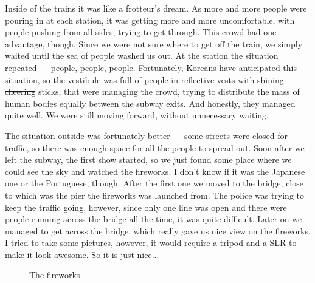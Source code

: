 \begin{post}
\begin{content}
Inside of the trains it was like a frotteur's dream. As more and more people were pouring in at each station, it was getting more and more uncomfortable, with people pushing from all sides, trying to get through. This crowd had one advantage, though. Since we were not sure where to get off the train, we simply waited until the sea of people washed us out. At the station the situation repeated — people, people, people. Fortunately, Koreans have anticipated this situation, so the vestibule was full of people in reflective vests with shining \sout{cheering} sticks, that were managing the crowd, trying to distribute the mass of human bodies equally between the subway exits. And honestly, they managed quite well. We were still moving forward, without unnecessary waiting.

The situation outside was fortunately better — some streets were closed for traffic, so there was enough space for all the people to spread out. Soon after we left the subway, the first show started, so we just found some place where we could see the sky and watched the fireworks. I don't know if it was the Japanese one or the Portuguese, though. After the first one we moved to the bridge, close to which was the pier the fireworks was launched from. The police was trying to keep the traffic going, however, since only one line was open and there were people running across the bridge all the time, it was quite difficult. Later on we managed to get across the bridge, which really gave us nice view on the fireworks. I tried to take some pictures, however, it would require a tripod and a SLR to make it look awesome. So it is just nice...

\begin{figure}[h]
\centering
{}
\caption{The fireworks}
\end{figure}


\end{content}
\end{post}

